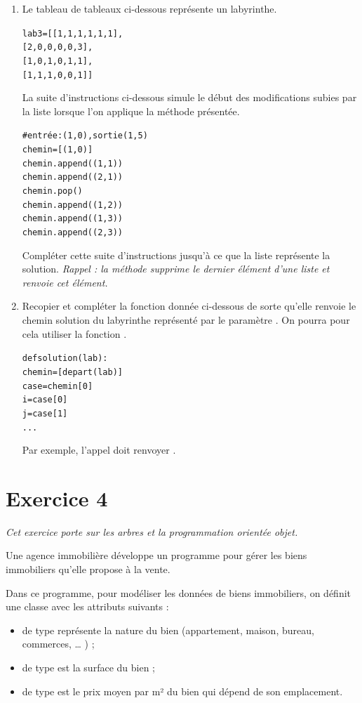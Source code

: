 \documentclass[11pt,a4paper,french,twoside]{PMCours}
\begin{document}
\begin{enumerate}
\begin{enumerate}
\item Le tableau de tableaux  ci-dessous représente un labyrinthe.
\begin{alltt}
lab3 = [[1, 1, 1, 1, 1, 1],
        [2, 0, 0, 0, 0, 3],
        [1, 0, 1, 0, 1, 1],
        [1, 1, 1, 0, 0, 1]]
\end{alltt}
La suite d'instructions ci-dessous simule le début des modifications subies par la liste
 lorsque l'on applique la méthode présentée.
\begin{alltt}
# entrée: (1, 0), sortie (1, 5)
chemin = [(1, 0)]
chemin.append((1, 1))
chemin.append((2, 1))
chemin.pop()
chemin.append((1, 2))
chemin.append((1, 3))
chemin.append((2, 3))
\end{alltt}
Compléter cette suite d'instructions jusqu'à ce que la liste  représente la
solution. \emph{Rappel : la méthode  supprime le dernier élément d'une liste et renvoie cet
élément.}
\item Recopier et compléter la fonction  donnée ci-dessous de sorte qu'elle
renvoie le chemin solution du labyrinthe représenté par le paramètre .
On pourra pour cela utiliser la fonction .
\begin{alltt}
def solution(lab):
    chemin = [depart(lab)]
    case = chemin[0]
    i = case[0]
    j = case[1]
    ...
\end{alltt}
Par exemple, l'appel  doit renvoyer \code{[(1, 0), (1, 1), (1, 2),
(1, 3), (1, 4), (1, 5), (2, 5), (3, 5), (4, 5), (5, 5), (6, 5)]}.
\end{enumerate}
\end{enumerate}


\newpage
\section*{Exercice 4}
\emph{Cet exercice porte sur les arbres et la programmation orientée objet.}

\medskip
Une agence immobilière développe un programme pour gérer les biens immobiliers qu'elle
propose à la vente.

Dans ce programme, pour modéliser les données de biens immobiliers, on définit une classe
 avec les attributs suivants :
\begin{itemize}
\item {} de type  représente la nature du bien (appartement, maison, bureau,
commerces, … ) ;
\item {} de type  est la surface du bien ;
\item {} de type  est le prix moyen par m² du bien qui dépend de son
emplacement.
\end{itemize}
\end{document}
